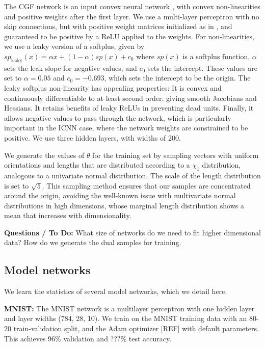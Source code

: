 \documentclass[11pt]{article}      %
\begin{document}
The CGF network is an input convex neural network \cite{amos_input_2017}, with convex non-linearities and positive weights after the first layer.
We use a multi-layer perceptron with no skip connections, but with positive weight matrices initialized as in \cite{hoedt_principled_2023}, and guaranteed to be positive by a ReLU applied to the weights.
For non-linearities, we use a leaky version of a softplus, given by $sp_{\textrm{leaky}}(x) = \alpha x + (1 - \alpha) sp(x) + c_0$ where $sp(x)$ is a softplus function, $\alpha$ sets the leak slope for negative values, and $c_0$ sets the intercept. 
These values are set to $\alpha =0.05$ and $c_0 = -0.693$, which sets the intercept to be the origin. 
The leaky softplus non-linearity has appealing properties:
It is convex and continuously differentiable to at least second order, giving smooth Jacobians and Hessians.
It retains benefits of leaky ReLUs in preventing dead units.
Finally, it allows negative values to pass through the network, which is particularly important in the ICNN case, where the network weights are constrained to be positive.
We use three hidden layers, with widths of 200.

We generate the values of $\theta$ for the training set by sampling vectors with uniform orientations and lengths that are distributed according to a $\chi_1$ distribution, analogous to a univariate normal distribution.
The scale of the length distribution is set to $\sqrt{5}$.
This sampling method ensures that our samples are concentrated around the origin, avoiding the well-known issue with multivariate normal distributions in high dimensions, whose marginal length distribution shows a mean that increases with dimensionality.


\noindent \textbf{Questions / To Do:}
What size of networks do we need to fit higher dimensional data?
How do we generate the dual samples for training.




\subsection{Model networks} \label{sec:model_network_details}
We learn the statistics of several model networks, which we detail here.

\noindent \textbf{MNIST:} The MNIST network is a multilayer perceptron with one hidden layer and layer widths (784, 28, 10).
We train on the MNIST training data with an 80-20 train-validation split, and the Adam optimizer [REF] with default parameters.
This achieves 96\% validation and ???\% test accuracy.
\end{document}
